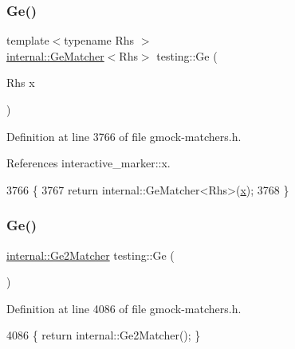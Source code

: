 \subsubsection{\texorpdfstring{Ge()}{Ge()}\hspace{0.1cm}{\footnotesize\ttfamily [1/2]}}
{\footnotesize\ttfamily template$<$typename Rhs $>$ \\
\hyperlink{classtesting_1_1internal_1_1GeMatcher}{internal\+::\+Ge\+Matcher}$<$Rhs$>$ testing\+::\+Ge (\begin{DoxyParamCaption}\item[{Rhs}]{x }\end{DoxyParamCaption})\hspace{0.3cm}{\ttfamily [inline]}}



Definition at line 3766 of file gmock-\/matchers.\+h.



References interactive\+\_\+marker\+::x.


\begin{DoxyCode}
3766                                         \{
3767   \textcolor{keywordflow}{return} internal::GeMatcher<Rhs>(\hyperlink{namespaceinteractive__marker_acda52804aef30b460a72fb21ee01d69d}{x});
3768 \}
\end{DoxyCode}
\mbox{\label{namespacetesting_a8cc0a6519e30bedf52c6e53c71e18265}} 
\subsubsection{\texorpdfstring{Ge()}{Ge()}\hspace{0.1cm}{\footnotesize\ttfamily [2/2]}}
{\footnotesize\ttfamily \hyperlink{classtesting_1_1internal_1_1Ge2Matcher}{internal\+::\+Ge2\+Matcher} testing\+::\+Ge (\begin{DoxyParamCaption}{ }\end{DoxyParamCaption})\hspace{0.3cm}{\ttfamily [inline]}}



Definition at line 4086 of file gmock-\/matchers.\+h.


\begin{DoxyCode}
4086 \{ \textcolor{keywordflow}{return} internal::Ge2Matcher(); \}
\end{DoxyCode}
\mbox{\label{namespacetesting_a56fbc164c7dc53596c23e519d8f1ca3c}} 
